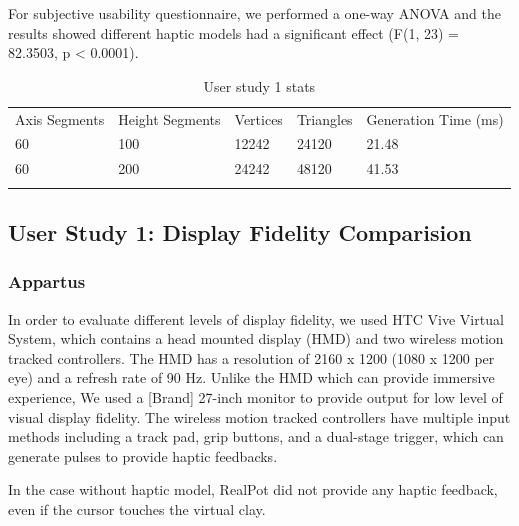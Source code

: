 For subjective usability questionnaire, we performed a one-way ANOVA and the results showed different haptic models had a significant effect (F(1, 23) = 82.3503, p < 0.0001).


\begin{table}
\caption{User study 1 stats}
\label{tab:u1}       %
\begin{tabular}{lllll}
\hline\noalign{\smallskip}
Axis Segments & Height Segments & Vertices & Triangles & Generation Time (ms)\\
\noalign{\smallskip}\hline\noalign{\smallskip}
60 & 100 & 12242 & 24120 & 21.48 \\
60 & 200 & 24242 & 48120 & 41.53 \\
\noalign{\smallskip}\hline
\end{tabular}
\end{table}



















\subsection{User Study 1: Display Fidelity Comparision}
\label{sec:study1}

\subsubsection{Appartus}
In order to evaluate different levels of display fidelity, we used HTC Vive Virtual System, which contains a head mounted display (HMD) and two wireless motion tracked controllers.
The HMD has a resolution of 2160 x 1200 (1080 x 1200 per eye) and a refresh rate of 90 Hz.
Unlike the HMD which can provide immersive experience, We used a [Brand] 27-inch monitor to provide output for low level of visual display fidelity.
The wireless motion tracked controllers have multiple input methods including a track pad, grip buttons, and a dual-stage trigger, which can generate pulses to provide haptic feedbacks.

In the case without haptic model, RealPot did not provide any haptic feedback, even if the cursor touches the virtual clay.

